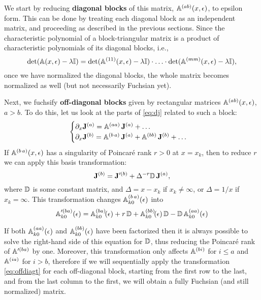 \documentclass[12pt,a4paper]{article}
\begin{document}
We start by reducing {\bf diagonal blocks} of this matrix, $\mathbb{A}^{(ab)}(x,\epsilon)$, to epsilon form.
This can be done by treating each diagonal block as an independent matrix, and proceeding as described in the previous sections.
Since the characteristic polynomial of a block-triangular matrix is a product of characteristic polynomials of its diagonal blocks, i.e.,
\begin{equation}
  \det(\mathbb{A}(x,\epsilon)-\lambda \mathbb{I}) =
    \det(\mathbb{A}^{(11)}(x,\epsilon) - \lambda\mathbb{I}) \cdot \ldots \cdot
    \det(\mathbb{A}^{(mm)}(x,\epsilon) - \lambda \mathbb{I}),
\end{equation}
once we have normalized the diagonal blocks, the whole matrix becomes normalized as well (but not necessarily Fuchsian yet).

Next, we fuchsify {\bf off-diagonal blocks} given by rectangular matrices $\mathbb{A}^{(ab)}(x,\epsilon)$, $a > b$.
To do this, let us look at the parts of \eqref{eq:dj} related to such a block:
\begin{equation}
  \begin{cases}
  \partial_x \mathbf{J}^{(a)} =
    \mathbb{A}^{(aa)}\,\mathbf{J}^{(a)} + \ldots \\
  \partial_x \mathbf{J}^{(b)} =
    \mathbb{A}^{(b\,a)}\,\mathbf{J}^{(a)} +
    \mathbb{A}^{(bb)}\,\mathbf{J}^{(b)} + \ldots
  \end{cases}
\end{equation}
If $\mathbb{A}^{(b\,a)}(x,\epsilon)$ has a singularity of Poincar\'e rank $r>0$ at $x=x_k$, then to reduce $r$ we can apply this basis transformation:
\begin{equation}
  \label{eq:offdiagt}
  \mathbf{J}^{(b)} = \mathbf{J}'^{(b)} + \Delta^{-r} \mathbb{D}\, \mathbf{J}^{(a)},
\end{equation}
where $\mathbb{D}$ is some constant matrix, and $\Delta=x-x_k$ if $x_k\ne\infty$, or $\Delta=1/x$ if $x_k=\infty$.
This transformation changes $\mathbb{A}^{(b\,a)}_{k0}(\epsilon)$ into
\begin{equation}
  \mathbb{A}'^{(ba)}_{k0}(\epsilon) = \mathbb{A}^{(ba)}_{k0}\!(\epsilon) + r\,\mathbb{D} + \mathbb{A}^{(bb)}_{k0}\!(\epsilon) \, \mathbb{D} - \mathbb{D}\, \mathbb{A}^{(aa)}_{k0}(\epsilon)
\end{equation}

If both $\mathbb{A}^{(aa)}_{k0}(\epsilon)$ and $\mathbb{A}^{(bb)}_{k0}(\epsilon)$ have been factorized then it is always possible to solve the right-hand side of this equation for $\mathbb{D}$, thus reducing the Poincar\'e rank of $\mathbb{A}'^{(ba)}$ by one.
Moreover, this transformation only affects $\mathbb{A}^{(bi)}$ for $i \le a$ and $\mathbb{A}^{(ia)}$ for $i > b$, therefore if we will sequentially apply the transformation \eqref{eq:offdiagt} for each off-diagonal block, starting from the first row to the last, and from the last column to the first, we will obtain a fully Fuchsian (and still normalized) matrix.
\end{document}
